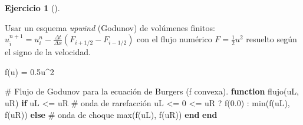 \documentclass[
  spanish,
  a4paper,
]{scrreport}
\newenvironment{Shaded}{\begin{snugshade}}{\end{snugshade}}
\newcommand{\CommentTok}[1]{\textcolor[rgb]{0.37,0.37,0.37}{#1}}
\newcommand{\ControlFlowTok}[1]{\textcolor[rgb]{0.00,0.23,0.31}{\textbf{#1}}}
\newcommand{\FloatTok}[1]{\textcolor[rgb]{0.68,0.00,0.00}{#1}}
\newcommand{\FunctionTok}[1]{\textcolor[rgb]{0.28,0.35,0.67}{#1}}
\newcommand{\KeywordTok}[1]{\textcolor[rgb]{0.00,0.23,0.31}{\textbf{#1}}}
\newcommand{\NormalTok}[1]{\textcolor[rgb]{0.00,0.23,0.31}{#1}}
\newcommand{\OperatorTok}[1]{\textcolor[rgb]{0.37,0.37,0.37}{#1}}
\theoremstyle{definition}
\newtheorem{exercise}{Ejercicio}[chapter]
\theoremstyle{remark}
\begin{document}
\begin{exercise}[]
\begin{enumerate}
\begin{tcolorbox}
  Usar un esquema \emph{upwind} (Godunov) de volúmenes finitos:
  \(u_i^{n+1} = u_i^n - \frac{\Delta t}{\Delta x}(F_{i+1/2} - F_{i-1/2})\)
  con el flujo numérico \(F = \frac12 u^2\) resuelto según el signo de
  la velocidad.

  \end{tcolorbox}

  \begin{tcolorbox}[enhanced jigsaw, arc=.35mm, bottomrule=.15mm, bottomtitle=1mm, breakable, colback=white, colbacktitle=quarto-callout-tip-color!10!white, colframe=quarto-callout-tip-color-frame, coltitle=black, left=2mm, leftrule=.75mm, opacityback=0, opacitybacktitle=0.6, rightrule=.15mm, title=\textcolor{quarto-callout-tip-color}{\faLightbulb}\hspace{0.5em}{Solución}, titlerule=0mm, toprule=.15mm, toptitle=1mm]

\begin{Shaded}
\begin{Highlighting}[]
\FunctionTok{f}\NormalTok{(u) }\OperatorTok{=} \FloatTok{0.5}\NormalTok{u}\OperatorTok{\^{}}\FloatTok{2}

\CommentTok{\# Flujo de Godunov para la ecuación de Burgers (f convexa).}
\KeywordTok{function} \FunctionTok{flujo}\NormalTok{(uL, uR)}
    \ControlFlowTok{if}\NormalTok{ uL }\OperatorTok{\textless{}=}\NormalTok{ uR                    }\CommentTok{\# onda de rarefacción}
\NormalTok{        uL }\OperatorTok{\textless{}=} \FloatTok{0} \OperatorTok{\textless{}=}\NormalTok{ uR ? }\FunctionTok{f}\NormalTok{(}\FloatTok{0.0}\NormalTok{) }\OperatorTok{:} \FunctionTok{min}\NormalTok{(}\FunctionTok{f}\NormalTok{(uL), }\FunctionTok{f}\NormalTok{(uR))}
    \ControlFlowTok{else}                           \CommentTok{\# onda de choque}
        \FunctionTok{max}\NormalTok{(}\FunctionTok{f}\NormalTok{(uL), }\FunctionTok{f}\NormalTok{(uR))}
    \ControlFlowTok{end}
\KeywordTok{end}


\end{Highlighting}
\end{Shaded}
\end{tcolorbox}
\end{enumerate}
\end{exercise}
\end{document}
